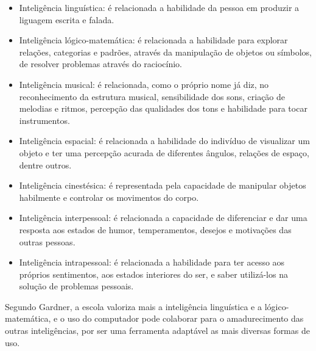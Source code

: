 \begin{itemize}
\item Inteligência linguística: é relacionada a habilidade da pessoa em produzir a liguagem escrita e falada.
\item Inteligência lógico-matemática: é relacionada a habilidade para explorar relações, categorias e padrões, através da manipulação de objetos ou símbolos, de resolver problemas através do raciocínio.
\item Inteligência musical: é relacionada, como o próprio nome já diz, no reconhecimento da estrutura musical, sensibilidade dos sons, criação de melodias e ritmos, percepção das qualidades dos tons e habilidade para tocar instrumentos.
\item Inteligência espacial: é relacionada a habilidade do indivíduo de visualizar um objeto e ter uma percepção acurada de diferentes ângulos, relações de espaço, dentre outros.
\item Inteligência cinestésica: é representada pela capacidade de manipular objetos habilmente e controlar os movimentos do corpo.
\item Inteligência interpessoal: é relacionada a capacidade de diferenciar e dar uma resposta aos estados de humor, temperamentos, desejos e motivações das outras pessoas.
\item Inteligência intrapessoal: é relacionada a habilidade para ter acesso aos próprios sentimentos, aos estados interiores do ser, e saber utilizá-los na solução de problemas pessoais. 
\end{itemize}
Segundo Gardner, a escola valoriza mais a inteligência linguística e a lógico-matemática, e o uso do computador pode colaborar para o amadurecimento das outras inteligências, por ser uma ferramenta adaptável as mais diversas formas de uso.
